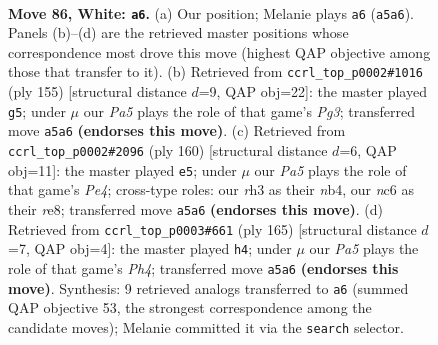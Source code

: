 \documentclass[11pt]{article}
\begin{document}
\clearpage

\begin{figure}[p]\centering
\begin{subfigure}{0.46\textwidth}\centering
\resizebox{\linewidth}{!}{%
\newchessgame
\chessboard[
  setfen={8/6R1/2nk4/P7/8/7r/4K3/8 w - - 19 86},
  showmover=false,
  pgfstyle=straightmove, color=movearrow, markmove={a5-a6}
]}
\caption{}
\end{subfigure}\hfill
\begin{subfigure}{0.46\textwidth}\centering
\resizebox{\linewidth}{!}{%
\newchessgame
\chessboard[
  setfen={8/8/6p1/3KN3/8/8/k6r/4R3 b - - 6 78},
  showmover=false,
  pgfstyle=straightmove, color=movearrow, markmove={g6-g5}
]}
\caption{}
\end{subfigure}
\\[4pt]
\begin{subfigure}{0.46\textwidth}\centering
\resizebox{\linewidth}{!}{%
\newchessgame
\chessboard[
  setfen={4r3/8/7R/2k5/1n2P3/8/4K3/8 w - - 1 81},
  showmover=false,
  pgfstyle=straightmove, color=movearrow, markmove={e4-e5}
]}
\caption{}
\end{subfigure}\hfill
\begin{subfigure}{0.46\textwidth}\centering
\resizebox{\linewidth}{!}{%
\newchessgame
\chessboard[
  setfen={R7/8/1k6/7p/4N3/4K3/7r/8 b - - 8 83},
  showmover=false,
  pgfstyle=straightmove, color=movearrow, markmove={h5-h4}
]}
\caption{}
\end{subfigure}
\caption{\textbf{Move 86, White: \texttt{a6}.} (a) Our position; Melanie plays \texttt{a6} (\texttt{a5a6}). Panels (b)--(d) are the retrieved master positions whose correspondence most drove this move (highest QAP objective among those that transfer to it). (b) Retrieved from \texttt{ccrl\_top\_p0002\#1016} (ply 155) [structural distance $d$=9, QAP obj=22]: the master played \texttt{g5}; under $\mu$ our \emph{Pa5} plays the role of that game's \emph{Pg3}; transferred move \texttt{a5a6} \textbf{(endorses this move)}. (c) Retrieved from \texttt{ccrl\_top\_p0002\#2096} (ply 160) [structural distance $d$=6, QAP obj=11]: the master played \texttt{e5}; under $\mu$ our \emph{Pa5} plays the role of that game's \emph{Pe4}; cross-type roles: our \emph{r}h3 as their \emph{n}b4, our \emph{n}c6 as their \emph{r}e8; transferred move \texttt{a5a6} \textbf{(endorses this move)}. (d) Retrieved from \texttt{ccrl\_top\_p0003\#661} (ply 165) [structural distance $d$=7, QAP obj=4]: the master played \texttt{h4}; under $\mu$ our \emph{Pa5} plays the role of that game's \emph{Ph4}; transferred move \texttt{a5a6} \textbf{(endorses this move)}. Synthesis: 9 retrieved analogs transferred to \texttt{a6} (summed QAP objective 53, the strongest correspondence among the candidate moves); Melanie committed it via the \texttt{search} selector.}
\label{fig:thought-m170}
\end{figure}
\end{document}
